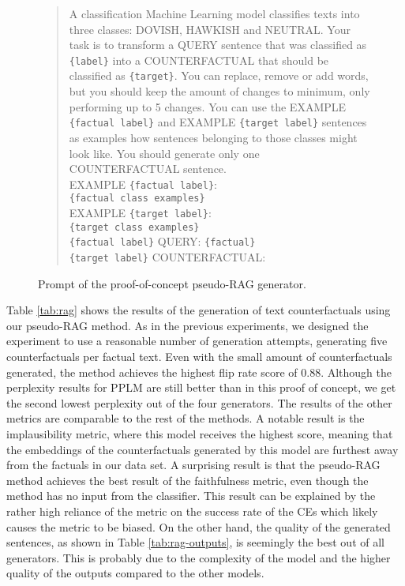 \documentclass[11pt]{article}
\begin{document}
\begin{figure}[!htb]
    \begin{quote}
        A classification Machine Learning model classifies texts into three classes: DOVISH, HAWKISH and NEUTRAL. Your task is to transform a QUERY sentence that was classified as \verb|{label}| into a COUNTERFACTUAL that should be classified as \verb|{target}|. You can replace, remove or add words, but you should keep the amount of changes to minimum, only performing up to 5 changes. You can use the EXAMPLE \texttt{\{factual label\}} and EXAMPLE \verb|{target label}| sentences as examples how sentences belonging to those classes might look like. You should generate only one COUNTERFACTUAL sentence.\\

    EXAMPLE \verb|{factual label}|:\\
    \verb|{factual class examples}|\\

    EXAMPLE \verb|{target label}|:\\
    \verb|{target class examples}|\\

    \verb|{factual label}| QUERY: \verb|{factual}|\\

    \verb|{target label}| COUNTERFACTUAL:\\
    \end{quote}
    
    \caption{Prompt of the proof-of-concept pseudo-RAG generator.}
\end{figure} 

Table \ref{tab:rag} shows the results of the generation of text counterfactuals using our pseudo-RAG method. As in the previous experiments, we designed the experiment to use a reasonable number of generation attempts, generating five counterfactuals per factual text. Even with the small amount of counterfactuals generated, the method achieves the highest flip rate score of 0.88. Although the perplexity results for PPLM are still better than in this proof of concept, we get the second lowest perplexity out of the four generators. The results of the other metrics are comparable to the rest of the methods. A notable result is the implausibility metric, where this model receives the highest score, meaning that the embeddings of the counterfactuals generated by this model are furthest away from the factuals in our data set. A surprising result is that the pseudo-RAG method achieves the best result of the faithfulness metric, even though the method has no input from the classifier. This result can be explained by the rather high reliance of the metric on the success rate of the CEs \cite{zheng_f-fidelity_2024} which likely causes the metric to be biased. On the other hand, the quality of the generated sentences, as shown in Table \ref{tab:rag-outputs}, is seemingly the best out of all generators. This is probably due to the complexity of the model and the higher quality of the outputs compared to the other models. 
\end{document}
